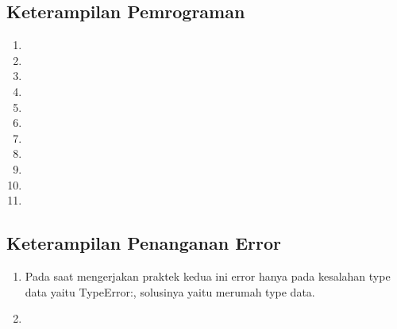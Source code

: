 \subsection{Keterampilan Pemrograman}
\begin{enumerate}
    \item 
    
    \item 
    
    \item 
    
    \item 
    
    \item 
    
    \item 
    
    \item 
    
    \item 
    
    \item 
    
    \item 
    
    \item 
    
\end{enumerate}

\subsection{Keterampilan Penanganan Error}
\begin{enumerate}
    \item Pada saat mengerjakan praktek kedua ini error hanya pada kesalahan type data yaitu TypeError:, solusinya yaitu merumah type data.
    
    \item 
    
\end{enumerate}
